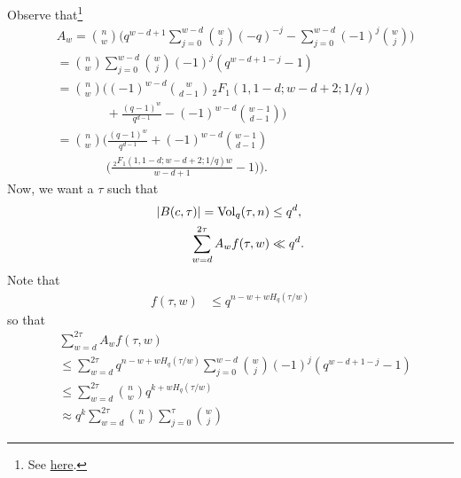 \documentclass[conference]{IEEEtran}
\begin{document}
{Observe that\footnote{See \href{https://math.stackexchange.com/questions/887960/truncated-alternating-binomial-sum}{here}.} 
\begin{align*}
    &A_{w} 
    = \binom{n}{w} 
    \bigg(q^{w - d + 1} \sum_{j = 0}^{w - d} \binom{w}{j} (-q)^{-j} - \sum_{j = 0}^{w - d} (-1)^{j} \binom{w}{j}\bigg) 
    \\ 
    &= \binom{n}{w} 
    \sum_{j = 0}^{w - d} \binom{w}{j} (-1)^{j} (q^{w - d + 1 - j} - 1) 
    \\ 
    &= \binom{n}{w} 
    \bigg((-1)^{w - d} \binom{w}{d - 1} \,_{2}F_{1}(1, 1 - d; w - d + 2; 1 / q) \\ 
    &\qquad \qquad + \frac{(q - 1)^{w}}{q^{d - 1}} 
    - (-1)^{w - d} \binom{w - 1}{d - 1}\bigg) \\ 
    &= \binom{n}{w} 
    \bigg(\frac{(q - 1)^{w}}{q^{d - 1}} + (-1)^{w - d} \binom{w - 1}{d - 1} \\ 
    & \qquad \qquad  \bigg(\frac{\,_{2}F_{1}(1, 1 - d; w - d + 2; 1 / q) w}{w - d + 1} - 1\bigg)\bigg)
    .
\end{align*}
Now, we want a $\tau$ such that 
\begin{align*}
    |B(c, \tau)| 
    = \operatorname{Vol}_{q}(\tau, n) 
    &\le q^{d}, \\ 
    \sum_{w = d}^{2 \tau} 
    A_{w} f(\tau, w) 
    &\ll q^{d}. 
\end{align*}
Note that 
\begin{align*}
    f(\tau, w) 
    &\le q^{n - w + w H_{q}(\tau / w)}
\end{align*}
so that 
\begin{align*}
    &\sum_{w = d}^{2 \tau} A_{w} f(\tau, w) \\ 
    &\le \sum_{w = d}^{2 \tau} 
    q^{n - w + w H_{q}(\tau / w)} 
    \sum_{j = 0}^{w - d} 
    \binom{w}{j} (-1)^{j} (q^{w - d + 1 - j} - 1) 
    \\ 
    &\le \sum_{w = d}^{2 \tau} 
    \binom{n}{w}
    q^{k + w H_{q}(\tau / w)} \\ 
    &\approx 
    q^{k} \sum_{w = d}^{2 \tau} 
    \binom{n}{w} 
    \sum_{j = 0}^{\tau} 
    \binom{w}{j} 

\end{align*}}
\end{document}
